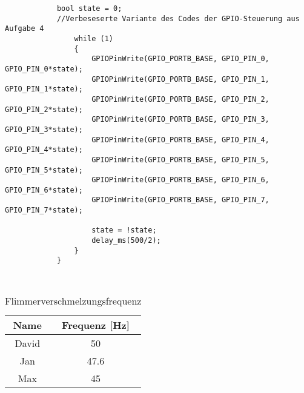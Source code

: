 \begin{lstlisting}
            bool state = 0;
            //Verbeseserte Variante des Codes der GPIO-Steuerung aus Aufgabe 4
                while (1)
                {
                    GPIOPinWrite(GPIO_PORTB_BASE, GPIO_PIN_0, GPIO_PIN_0*state);
                    GPIOPinWrite(GPIO_PORTB_BASE, GPIO_PIN_1, GPIO_PIN_1*state);
                    GPIOPinWrite(GPIO_PORTB_BASE, GPIO_PIN_2, GPIO_PIN_2*state);
                    GPIOPinWrite(GPIO_PORTB_BASE, GPIO_PIN_3, GPIO_PIN_3*state);
                    GPIOPinWrite(GPIO_PORTB_BASE, GPIO_PIN_4, GPIO_PIN_4*state);
                    GPIOPinWrite(GPIO_PORTB_BASE, GPIO_PIN_5, GPIO_PIN_5*state);
                    GPIOPinWrite(GPIO_PORTB_BASE, GPIO_PIN_6, GPIO_PIN_6*state);
                    GPIOPinWrite(GPIO_PORTB_BASE, GPIO_PIN_7, GPIO_PIN_7*state);

                    state = !state;
                    delay_ms(500/2);
                }
            }


\end{lstlisting}
\subsection{}
\begin{table}[htb]
    \centering
    \caption{Flimmerverschmelzungsfrequenz}
    \label{tab:Flimmerverschmelzungsfrequenz}
    \begin{tabular}{cc}
        \toprule
        Name & Frequenz [\si{\hertz}] \\
        \midrule
        David & \num{50}  \\
        Jan & \num{47.6} \\
        Max & \num{45} \\
        \bottomrule
    \end{tabular}
    
\end{table}